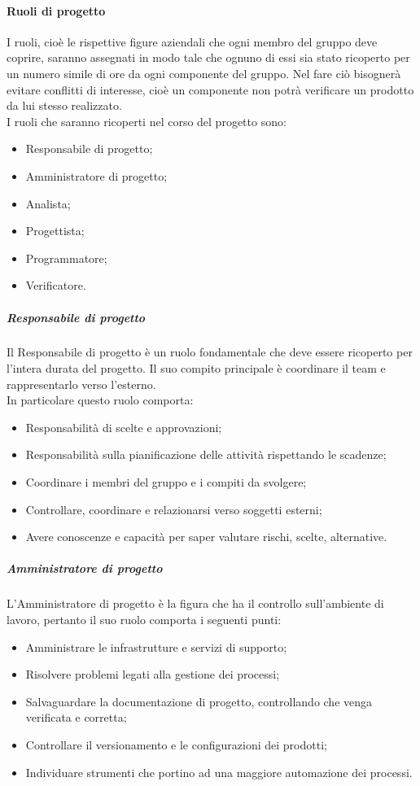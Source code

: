 \paragraph{Ruoli di progetto}
I ruoli, cioè le rispettive figure aziendali che ogni membro del gruppo deve coprire, saranno assegnati in modo tale che ognuno di essi sia stato ricoperto per un numero simile di ore da ogni componente del gruppo. Nel fare ciò bisognerà evitare conflitti di interesse, cioè un componente non potrà verificare un prodotto da lui stesso realizzato. \\
I ruoli che saranno ricoperti nel corso del progetto sono:
\begin{itemize}
    \item Responsabile di progetto;
    \item Amministratore di progetto;
    \item Analista;
    \item Progettista;
    \item Programmatore;
    \item Verificatore.
\end{itemize}

\subparagraph{Responsabile di progetto}
Il Responsabile di progetto è un ruolo fondamentale che deve essere ricoperto per l'intera durata del progetto. Il suo compito principale è coordinare il team e rappresentarlo verso l'esterno. \\
In particolare questo ruolo comporta:
\begin{itemize}
    \item Responsabilità di scelte e approvazioni;
    \item Responsabilità sulla pianificazione delle attività rispettando le scadenze;
    \item Coordinare i membri del gruppo e i compiti da svolgere;
    \item Controllare, coordinare e relazionarsi verso soggetti esterni;
    \item Avere conoscenze e capacità per saper valutare rischi, scelte, alternative.
\end{itemize}

\subparagraph{Amministratore di progetto}
L'Amministratore di progetto è la figura che ha il controllo sull'ambiente di lavoro, pertanto il suo ruolo comporta i seguenti punti:
\begin{itemize}
    \item Amministrare le infrastrutture e servizi di supporto;
    \item Risolvere problemi legati alla gestione dei processi;
    \item Salvaguardare la documentazione di progetto, controllando che venga verificata e corretta;
    \item Controllare il versionamento e le configurazioni dei prodotti;
    \item Individuare strumenti che portino ad una maggiore automazione dei processi.
\end{itemize}


